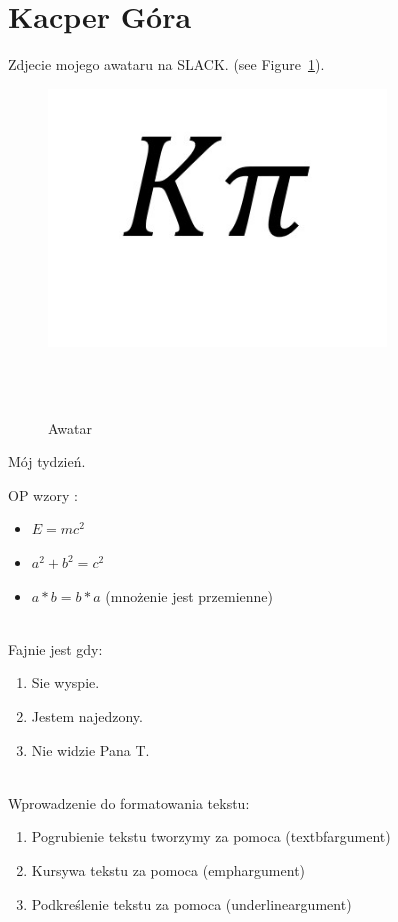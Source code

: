 \section{Kacper Góra}

Zdjecie mojego awataru na SLACK. (see Figure~\ref{fig:kpi}).

\begin{figure}[htbp]
    \centering
    \includegraphics[width=0.8\textwidth]{pictures/kpi.jpg}
    \caption{Awatar}\\\\
    \label{fig:kpi}
\end{figure}

Mój tydzień.



\newpage
OP wzory :
\begin{itemize}
    \item $ E=mc^2 $
    \item $ a^2 + b^2 = c^2 $
    \item $ a * b = b * a $ (mnożenie jest przemienne)\\\\
\end{itemize}


Fajnie jest gdy:
\begin{enumerate}
    \item Sie wyspie.
    \item Jestem najedzony.
    \item Nie widzie Pana T.\\\\
\end{enumerate}

    Wprowadzenie do formatowania tekstu:
\begin{enumerate}
    \item Pogrubienie tekstu tworzymy za pomoca (textbf{argument})
    \item Kursywa tekstu za pomoca (emph{argument})
    \item Podkreślenie tekstu za pomoca (underline{argument})\\\\
\end{enumerate}

